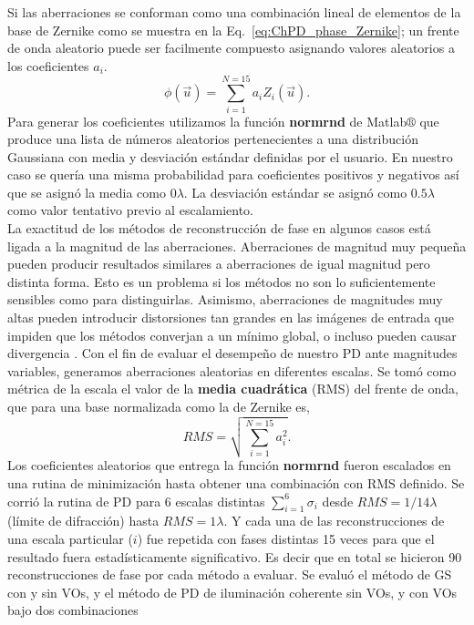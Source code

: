 Si las aberraciones se conforman como una combinación lineal de
elementos de la base de Zernike como se muestra en la
Eq.~\ref{eq:ChPD_phase_Zernike}; un frente de onda aleatorio puede ser 
facilmente compuesto asignando valores aleatorios a los coeficientes $a_i$. 
\begin{equation}
\label{eq:ChPD_phase_Zernike}
\phi(\vec{u}) = \sum_{i=1}^{N=15}a_iZ_i(\vec{u}). 
\end{equation}
Para generar los coeficientes utilizamos la función \textbf{normrnd}
de Matlab$\circledR$ que produce una lista de números aleatorios pertenecientes
 a una distribución Gaussiana con media y desviación
estándar definidas por el usuario.  En nuestro caso se quería una
misma probabilidad para coeficientes positivos y negativos así que se asignó la media
como $0\lambda$. La desviación estándar se asignó como $0.5\lambda$ como valor
tentativo previo al escalamiento.\\
La exactitud de los métodos de reconstrucción de fase en algunos casos
está ligada a la magnitud de las aberraciones. Aberraciones de
magnitud muy pequeña pueden producir resultados similares a
aberraciones de igual magnitud pero distinta forma. Esto es un
problema si los métodos no son lo suficientemente sensibles como para
distinguirlas. Asimismo, aberraciones de magnitudes muy altas pueden
introducir distorsiones tan grandes en las imágenes de entrada que
impiden que los métodos converjan a un mínimo global, o incluso pueden
causar divergencia . Con el fin de evaluar el desempeño de nuestro
PD ante magnitudes variables, generamos aberraciones aleatorias en diferentes
escalas. Se tomó como métrica de la escala el valor de la \textbf{media
cuadrática} (\acrshort{RMS})  del frente de
onda, que para una base normalizada como la de Zernike es,
$$RMS =  \sqrt{\sum_{i=1}^{N=15}a_i^2 }.$$
Los coeficientes aleatorios que entrega la función \textbf{normrnd}
fueron escalados en una rutina de minimización hasta obtener una
combinación con RMS definido.  
Se corrió la rutina de PD para 6 escalas distintas  $\sum_{i=1}^6\sigma_i$ desde
$RMS = 1/14\lambda$ (límite de 
difracción) hasta $RMS = 1\lambda$. Y cada una de las reconstrucciones
de una escala particular ($i$) fue repetida con fases distintas 15 veces
para que el resultado fuera estadísticamente significativo. Es decir
que en total se hicieron  90 reconstrucciones de fase por cada método
a evaluar. Se evaluó el método de GS con y sin VOs, y el método de PD
de iluminación coherente sin VOs, y con VOs bajo dos combinaciones
